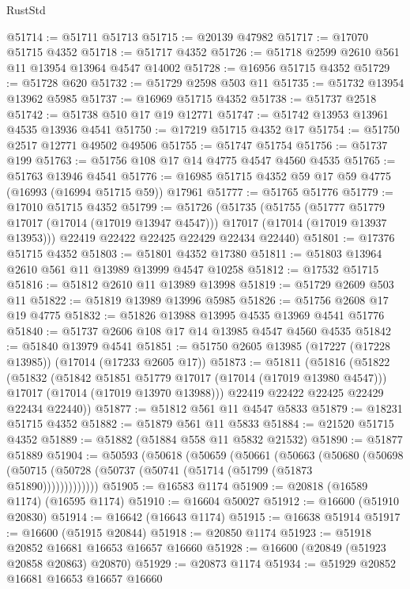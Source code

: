 \begin{lexlean}{RustStd}
\begin{coremodule}
@51714 := @51711 @51713
@51715 := @20139 @47982
@51717 := @17070 @51715 @4352
@51718 := @51717 @4352
@51726 := @51718 @2599 @2610 @561 @11 @13954 @13964 @4547 @14002
@51728 := @16956 @51715 @4352
@51729 := @51728 @620
@51732 := @51729 @2598 @503 @11
@51735 := @51732 @13954 @13962 @5985
@51737 := @16969 @51715 @4352
@51738 := @51737 @2518
@51742 := @51738 @510 @17 @19 @12771
@51747 := @51742 @13953 @13961 @4535 @13936 @4541
@51750 := @17219 @51715 @4352 @17
@51754 := @51750 @2517 @12771 @49502 @49506
@51755 := @51747 @51754
@51756 := @51737 @199
@51763 := @51756 @108 @17 @14 @4775 @4547 @4560 @4535
@51765 := @51763 @13946 @4541
@51776 := @16985 @51715 @4352 @59 @17 @59 @4775 (@16993 (@16994 @51715 @59)) @17961
@51777 := @51765 @51776
@51779 := @17010 @51715 @4352
@51799 := @51726
    (@51735
      (@51755
        (@51777 @51779 @17017 (@17014 (@17019 @13947 @4547)))
        @17017
        (@17014 (@17019 @13937 @13953)))
      @22419
      @22422
      @22425
      @22429
      @22434
      @22440)
@51801 := @17376 @51715 @4352
@51803 := @51801 @4352 @17380
@51811 := @51803 @13964 @2610 @561 @11 @13989 @13999 @4547 @10258
@51812 := @17532 @51715
@51816 := @51812 @2610 @11 @13989 @13998
@51819 := @51729 @2609 @503 @11
@51822 := @51819 @13989 @13996 @5985
@51826 := @51756 @2608 @17 @19 @4775
@51832 := @51826 @13988 @13995 @4535 @13969 @4541 @51776
@51840 := @51737 @2606 @108 @17 @14 @13985 @4547 @4560 @4535
@51842 := @51840 @13979 @4541
@51851 := @51750 @2605 @13985 (@17227 (@17228 @13985)) (@17014 (@17233 @2605 @17))
@51873 := @51811
    (@51816
      (@51822
        (@51832
          (@51842 @51851 @51779 @17017 (@17014 (@17019 @13980 @4547)))
          @17017
          (@17014 (@17019 @13970 @13988)))
        @22419
        @22422
        @22425
        @22429
        @22434
        @22440))
@51877 := @51812 @561 @11 @4547 @5833
@51879 := @18231 @51715 @4352
@51882 := @51879 @561 @11 @5833
@51884 := @21520 @51715 @4352
@51889 := @51882 (@51884 @558 @11 @5832 @21532)
@51890 := @51877 @51889
@51904 := @50593
    (@50618
      (@50659
        (@50661
          (@50663
            (@50680
              (@50698 (@50715 (@50728 (@50737 (@50741 (@51714 (@51799 (@51873 @51890)))))))))))))
@51905 := @16583 @1174
@51909 := @20818 (@16589 @1174) (@16595 @1174)
@51910 := @16604 @50027
@51912 := @16600 (@51910 @20830)
@51914 := @16642 (@16643 @1174)
@51915 := @16638 @51914
@51917 := @16600 (@51915 @20844)
@51918 := @20850 @1174
@51923 := @51918 @20852 @16681 @16653 @16657 @16660
@51928 := @16600 (@20849 (@51923 @20858 @20863) @20870)
@51929 := @20873 @1174
@51934 := @51929 @20852 @16681 @16653 @16657 @16660

\end{coremodule}
\end{lexlean}
